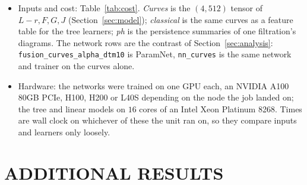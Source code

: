 \begin{itemize}
{        alpha alone and $70\,728$ on the curves alone. Estimators differ only in the width of the final layer, so
        each is within $200$ parameters of its classifier.}
  \item Inputs and cost: Table~\ref{tab:cost}. \emph{Curves} is the $(4,512)$ tensor of
        $L-r,F,G,J$ (Section~\ref{sec:model}); \emph{classical} is the same curves as a feature table for the tree
        learners; \emph{ph} is the persistence summaries of one filtration's diagrams. The  network rows are the
        contrast of Section~\ref{sec:analysis}: \texttt{fusion\_curves\_alpha\_dtm10} is ParamNet,
        \texttt{nn\_curves} is the same network and trainer on the curves alone.
  \item Hardware: the networks were trained on one GPU each, an NVIDIA A100 80GB PCIe, H100, H200 or L40S
        depending on the node the job landed on; the tree and linear models on $16$ cores of an Intel Xeon Platinum
        8268. Times are wall clock on whichever of these the unit ran on, so they compare inputs and learners only
        loosely.
\end{itemize}

\begin{table}[h]
\caption{Each model's input representation and training cost. ``Classifier'' is wall-clock seconds to train the one
$8$-way classifier until early stopping; ``Estimators'' is the same summed over the seven per-family estimators.
``Input'' names the tensors the model sees: \emph{curves} is the $(4,512)$ summary-function stack, \emph{classical}
the same curves as a feature table for the tree learners, and each filtration name a persistence summary of that
filtration's diagrams.  share one trainer and stopping rule, so their differences are the
cost of the persistence images alone. Lower is cheaper; cost is not the point of the comparison.}
\label{tab:cost}
\begin{center}
\footnotesize

\end{center}
\end{table}


\section{ADDITIONAL RESULTS}
\label{app:results}

